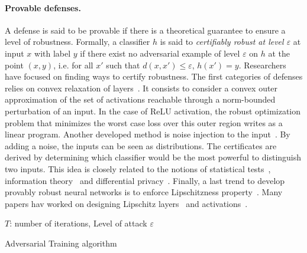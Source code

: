 \paragraph{Provable defenses.} A defense is said to be provable if there is a theoretical guarantee to ensure a level of robustness. Formally, a classifier $h$ is said to \emph{certifiably robust at level $\varepsilon$} at input $x$ with label $y$ if there exist no adversarial example of level $\varepsilon$ on $h$ at the point $(x,y)$, i.e. for all $x'$ such that $d(x,x')\leq\varepsilon$, $h(x') = y$. Researchers have focused on finding ways to certify robustness. The first categories of defenses relies on convex relaxation of layers~\citep{wong2018provable,wong2018scaling}. It consists to consider a convex outer approximation of the set of activations reachable through a norm-bounded perturbation of an input. In the case of ReLU activation, the robust optimization problem  that minimizes the worst case loss over this outer region writes as a linear program. Another developed method is noise injection to the input~\citep{lecuyer2019certified,KolterRandomizedSmoothing,pinot2019theoretical,salman2019provably}. By adding a noise, the inputs can be seen as distributions. The certificates are derived by determining which classifier would be the most powerful to distinguish two inputs. This idea is closely related to the notions of statistical tests~\citep{KolterRandomizedSmoothing}, information theory~\citep{pinot2019theoretical} and differential privacy~\citep{lecuyer2018certified}. Finally, a last trend to develop provably robust neural networks is to enforce Lipschitzness property~\citep{tsuzuku2018lipschitz}. Many papers hav worked on designing Lipschitz layers~\citep{li2019preventing,trockman2021orthogonalizing,skew2021sahil} and activations~\citep{anil2019sorting,singla2021householder,huang2021local}.


\begin{algorithm}[h!]
  \SetAlgoLined
  $T$: number of iterations, Level of attack $\varepsilon$ \\
   \caption{Adversarial Training algorithm}
   \label{algo:adv-training}
\end{algorithm}
  

